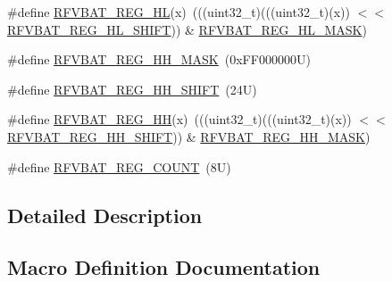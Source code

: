 \begin{DoxyCompactItemize}
\item 
\#define \mbox{\hyperlink{group___r_f_v_b_a_t___register___masks_gade785dbcefc44dd4be0a7a423e05affb}{R\+F\+V\+B\+A\+T\+\_\+\+R\+E\+G\+\_\+\+HL}}(x)~(((uint32\+\_\+t)(((uint32\+\_\+t)(x)) $<$$<$ \mbox{\hyperlink{group___r_f_v_b_a_t___register___masks_ga069a18ff685d5c1e8e48acc77454bf70}{R\+F\+V\+B\+A\+T\+\_\+\+R\+E\+G\+\_\+\+H\+L\+\_\+\+S\+H\+I\+FT}})) \& \mbox{\hyperlink{group___r_f_v_b_a_t___register___masks_gae0f69a55f5feaf1e41b317aaa17780fe}{R\+F\+V\+B\+A\+T\+\_\+\+R\+E\+G\+\_\+\+H\+L\+\_\+\+M\+A\+SK}})
\item 
\#define \mbox{\hyperlink{group___r_f_v_b_a_t___register___masks_gad2932f13b6d26fa7ccb982b9cffcd184}{R\+F\+V\+B\+A\+T\+\_\+\+R\+E\+G\+\_\+\+H\+H\+\_\+\+M\+A\+SK}}~(0x\+F\+F000000\+U)
\item 
\#define \mbox{\hyperlink{group___r_f_v_b_a_t___register___masks_gae67376345507e381e7f56f8bae49359c}{R\+F\+V\+B\+A\+T\+\_\+\+R\+E\+G\+\_\+\+H\+H\+\_\+\+S\+H\+I\+FT}}~(24\+U)
\item 
\#define \mbox{\hyperlink{group___r_f_v_b_a_t___register___masks_gad544c6138476e4e13e072614ac354d2c}{R\+F\+V\+B\+A\+T\+\_\+\+R\+E\+G\+\_\+\+HH}}(x)~(((uint32\+\_\+t)(((uint32\+\_\+t)(x)) $<$$<$ \mbox{\hyperlink{group___r_f_v_b_a_t___register___masks_gae67376345507e381e7f56f8bae49359c}{R\+F\+V\+B\+A\+T\+\_\+\+R\+E\+G\+\_\+\+H\+H\+\_\+\+S\+H\+I\+FT}})) \& \mbox{\hyperlink{group___r_f_v_b_a_t___register___masks_gad2932f13b6d26fa7ccb982b9cffcd184}{R\+F\+V\+B\+A\+T\+\_\+\+R\+E\+G\+\_\+\+H\+H\+\_\+\+M\+A\+SK}})
\item 
\#define \mbox{\hyperlink{group___r_f_v_b_a_t___register___masks_ga99df704f6ef4a33600778dd5a59b443c}{R\+F\+V\+B\+A\+T\+\_\+\+R\+E\+G\+\_\+\+C\+O\+U\+NT}}~(8\+U)
\end{DoxyCompactItemize}


\subsection{Detailed Description}


\subsection{Macro Definition Documentation}
\mbox{\label{group___r_f_v_b_a_t___register___masks_gac2c2895b56604565c1deab90aedbf1a4}} 

